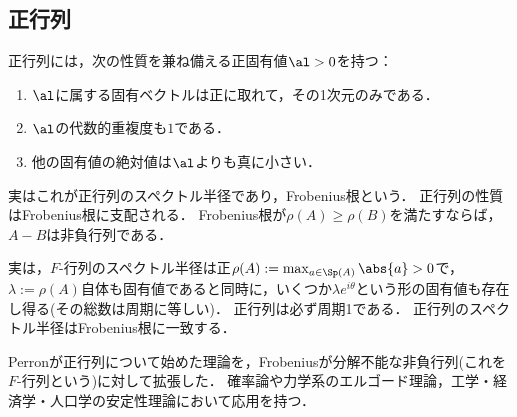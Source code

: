 \documentclass[uplatex, dvipdfmx]{jsreport}
\begin{document}
\subsection{正行列}

\begin{tcolorbox}[colframe=ForestGreen, colback=ForestGreen!10!white,breakable,colbacktitle=ForestGreen!40!white,coltitle=black,fonttitle=\bfseries\sffamily,
title=]
    正行列には，次の性質を兼ね備える正固有値$\al>0$を持つ：
    \begin{enumerate}
        \item $\al$に属する固有ベクトルは正に取れて，その1次元のみである．
        \item $\al$の代数的重複度も$1$である．
        \item 他の固有値の絶対値は$\al$よりも真に小さい．
    \end{enumerate}
    実はこれが正行列のスペクトル半径であり，Frobenius根という．
    正行列の性質はFrobenius根に支配される．
    Frobenius根が$\rho(A)\ge\rho(B)$を満たすならば，$A-B$は非負行列である．
\end{tcolorbox}

\begin{tcolorbox}[colframe=ForestGreen, colback=ForestGreen!10!white,breakable,colbacktitle=ForestGreen!40!white,coltitle=black,fonttitle=\bfseries\sffamily,
title=]
    実は，$F$-行列のスペクトル半径は正$\rho(A):=\max_{a\in\Sp(A)}\abs{a}>0$で，$\lambda:=\rho(A)$自体も固有値であると同時に，いくつか$\lambda e^{i\theta}$という形の固有値も存在し得る(その総数は周期に等しい)．
    正行列は必ず周期1である．
    正行列のスペクトル半径はFrobenius根に一致する．
\end{tcolorbox}

\begin{history}
    Perronが正行列について始めた理論を，Frobeniusが分解不能な非負行列(これを$F$-行列という)に対して拡張した．
    確率論や力学系のエルゴード理論，工学・経済学・人口学の安定性理論において応用を持つ．
\end{history}
\end{document}
